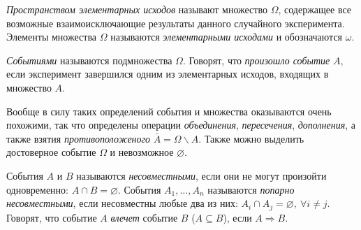 \begin{to_def}
    \textit{Пространством элементарных исходов} называют множество $\Omega$, содержащее все возможные взаимоисключающие результаты данного случайного эксперимента. Элементы множества $\Omega$ называются \textit{элементарными исходами} и обозначаются $\omega$.
\end{to_def}

\begin{to_def}
    \textit{Событиями} называются подмножества $\Omega$. Говорят, что \textit{произошло событие} $A$, если эксперимент завершился одним из элементарных исходов, входящих в множество $A$. 
\end{to_def}

Вообще в силу таких определений события и множества оказываются очень похожими, так что определены операции \textit{объединения}, \textit{пересечения}, \textit{дополнения}, а также взятия \textit{противоположеного} $\bar{A} = \Omega \backslash A$. Также можно выделить достоверное событие $\Omega$ и невозможное $\varnothing$. 

События $A$ и $B$ называются \textit{несовместными}, если они не могут произойти одновременно: $A \cap B = \varnothing$. События $A_1, \ldots, A_n$ называются \textit{попарно несовместными}, если несовместны любые два из них: $A_i \cap A_j = \varnothing, \ \forall i \neq j$. Говорят, что событие $A$ \textit{влечет} событие $B$ ($A \subseteq B$), если $A \Rightarrow B$. 

